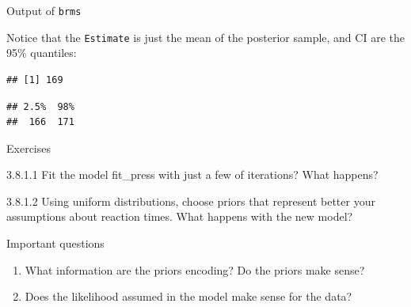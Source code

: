 \documentclass[12pt,ignorenonframetext,aspectratio=169]{beamer}
\newenvironment{Shaded}{\begin{snugshade}}{\end{snugshade}}
\newcommand{\FloatTok}[1]{\textcolor[rgb]{0.00,0.00,0.81}{#1}}
\newcommand{\KeywordTok}[1]{\textcolor[rgb]{0.13,0.29,0.53}{\textbf{#1}}}
\newcommand{\NormalTok}[1]{#1}
\newcommand{\OperatorTok}[1]{\textcolor[rgb]{0.81,0.36,0.00}{\textbf{#1}}}
\newcommand{\StringTok}[1]{\textcolor[rgb]{0.31,0.60,0.02}{#1}}
\providecommand{\tightlist}{%
  \setlength{\itemsep}{0pt}\setlength{\parskip}{0pt}}
\begin{document}
\begin{frame}[fragile]{Output of \texttt{brms}}
\protect\hypertarget{output-of-brms-3}{}

Notice that the \texttt{Estimate} is just the mean of the posterior sample, and
CI are the 95\% quantiles:

\small

\begin{Shaded}
\end{Shaded}

\begin{verbatim}
## [1] 169
\end{verbatim}

\begin{Shaded}
\end{Shaded}

\begin{verbatim}
## 2.5%  98% 
##  166  171
\end{verbatim}

\normalsize

\end{frame}

\begin{frame}

\begin{block}{\color{blue} Exercises}

3.8.1.1 Fit the model fit\_press with just a few of iterations? What happens?

3.8.1.2 Using uniform distributions, choose priors that represent better your assumptions about reaction times. What happens with the new model?

\end{block}

\end{frame}

\begin{frame}{Important questions}
\protect\hypertarget{important-questions}{}

\large

\begin{enumerate}
\tightlist
\item
  What information are the priors encoding? Do the priors make sense?
\item
  Does the likelihood assumed in the model make sense for the data?
\end{enumerate}

\end{frame}
\end{document}
